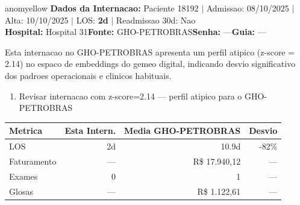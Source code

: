\documentclass[a4paper,10pt]{article}
\begin{document}
\begin{anomalycard}[Internacao 150453 | GHO-PETROBRAS | MODERADO (z=2.14)]{anomyellow}
\textbf{Dados da Internacao:} Paciente 18192 $\mid$ Admissao: 08/10/2025 $\mid$ Alta: 10/10/2025 $\mid$ LOS: \textbf{2d} $\mid$ Readmissao 30d: Nao\\
\textbf{Hospital:} Hospital 31\quad\textbf{Fonte:} GHO-PETROBRAS\quad\textbf{Senha:} ---\quad\textbf{Guia:} ---\\
\vspace{2pt}\begin{tcolorbox}[colback=severityred!20,colframe=anomyellow,title={\textbf{Interpretacao de Negocio}},fonttitle=\bfseries\small,left=4pt,right=4pt,top=3pt,bottom=3pt]
{\small Esta internacao no GHO-PETROBRAS apresenta um perfil atipico (z-score = 2.14) no espaco de embeddings do gemeo digital, indicando desvio significativo dos padroes operacionais e clinicos habituais.}
\end{tcolorbox}
\begin{tcolorbox}[colback=severityyellow!30,colframe=anomorange,title={\textbf{Recomendacoes Especificas}},fonttitle=\bfseries\small,left=4pt,right=4pt,top=3pt,bottom=3pt]
\begin{enumerate}[nosep,leftmargin=16pt]
\item {\small Revisar internacao com z-score=2.14 --- perfil atipico para o GHO-PETROBRAS}
\end{enumerate}
\end{tcolorbox}
\begin{center}\begin{tabular}{l r r r}\toprule\textbf{Metrica} & \textbf{Esta Intern.} & \textbf{Media GHO-PETROBRAS} & \textbf{Desvio} \\\midrule
LOS & 2d & 10.9d & -82\% \\
Faturamento & --- & R\$ 17.940,12 & --- \\
Exames & 0 & 1 & --- \\
Glosas & --- & R\$ 1.122,61 & --- \\
\bottomrule\end{tabular}\end{center}


\end{anomalycard}
\end{document}
